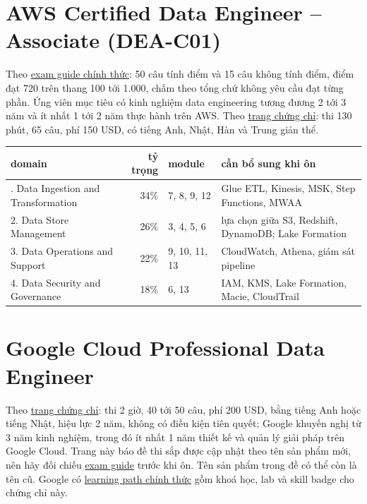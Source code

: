 \documentclass[11pt,a4paper,oneside]{report}
\newcommand{\thd}[1]{\textbf{\sffamily\small #1}}
\begin{document}
\section{AWS Certified Data Engineer -- Associate (DEA-C01)}
Theo \href{https://docs.aws.amazon.com/aws-certification/latest/data-engineer-associate-01/data-engineer-associate-01.html}{exam guide chính thức}: 50 câu tính điểm và 15 câu không tính điểm, điểm đạt 720 trên thang 100 tới 1.000, chấm theo tổng chứ không yêu cầu đạt từng phần. Ứng viên mục tiêu có kinh nghiệm data engineering tương đương 2 tới 3 năm và ít nhất 1 tới 2 năm thực hành trên AWS. Theo \href{https://aws.amazon.com/certification/certified-data-engineer-associate/}{trang chứng chỉ}: thi 130 phút, 65 câu, phí 150 USD, có tiếng Anh, Nhật, Hàn và Trung giản thể.

\begin{xltabular}{\textwidth}{@{}P{5.2cm} r P{2.4cm} L@{}}
\toprule
\thd{domain} & \thd{tỷ trọng} & \thd{module} & \thd{cần bổ sung khi ôn} \\
\midrule
\endhead
\bottomrule
{}. Data Ingestion and Transformation & 34\% & 7, 8, 9, 12 & Glue ETL, Kinesis, MSK, Step Functions, MWAA \\
2. Data Store Management & 26\% & 3, 4, 5, 6 & lựa chọn giữa S3, Redshift, DynamoDB; Lake Formation \\
3. Data Operations and Support & 22\% & 9, 10, 11, 13 & CloudWatch, Athena, giám sát pipeline \\
4. Data Security and Governance & 18\% & 6, 13 & IAM, KMS, Lake Formation, Macie, CloudTrail \\
\end{xltabular}

\section{Google Cloud Professional Data Engineer}
Theo \href{https://cloud.google.com/learn/certification/data-engineer}{trang chứng chỉ}: thi 2 giờ, 40 tới 50 câu, phí 200 USD, bằng tiếng Anh hoặc tiếng Nhật, hiệu lực 2 năm, không có điều kiện tiên quyết; Google khuyến nghị từ 3 năm kinh nghiệm, trong đó ít nhất 1 năm thiết kế và quản lý giải pháp trên Google Cloud. Trang này báo đề thi sắp được cập nhật theo tên sản phẩm mới, nên hãy đối chiếu \href{https://services.google.com/fh/files/misc/professional_data_engineer_exam_guide_english.pdf}{exam guide} trước khi ôn. Tên sản phẩm trong đề có thể còn là tên cũ. Google có \href{https://www.skills.google/paths/16}{learning path chính thức} gồm khoá học, lab và skill badge cho chứng chỉ này.
\end{document}
